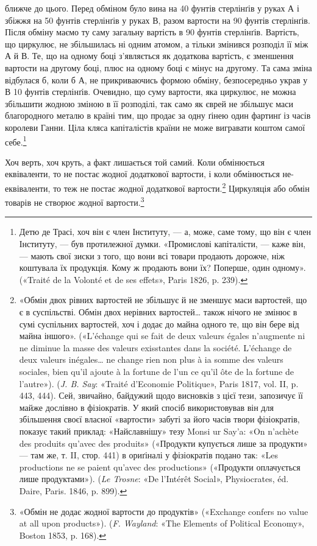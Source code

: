 \parcont{}  %
ближче до цього. Перед обміном було вина на 40 фунтів стерлінґів
у руках $А$ і збіжжя на 50 фунтів стерлінґів у руках $В$, разом
вартости на 90 фунтів стерлінґів. Після обміну маємо ту саму
загальну вартість в 90 фунтів стерлінґів. Вартість, що циркулює,
не збільшилась ні одним атомом, а тільки змінився розподіл її
між $А$ й $В$. Те, що на одному боці з’являється як додаткова вартість,
є зменшення вартости на другому боці, плюс на одному
боці є мінус на другому. Та сама зміна відбулася б, коли б $А$, не
прикриваючись формою обміну, безпосередньо украв у $В$ 10 фунтів
стерлінґів. Очевидно, що суму вартости, яка циркулює, не
можна збільшити жодною зміною в її розподілі, так само як єврей
не збільшує маси благородного металю в країні тим, що продає
за одну ґінею один фартинґ із часів королеви Ганни. Ціла
кляса капіталістів країни не може вигравати коштом самої себе.\footnote{
Детю де Трасі, хоч він є член Інституту, — а, може, саме тому,
що він є член Інституту, — був протилежної думки. «Промислові капіталісти,
— каже він, — мають свої зиски з того, що вони всі товари продають
дорожче, ніж коштувала їх продукція. Кому ж продають вони їх?
Поперше, один одному». («Traité de la Volonté et de ses effets», Paris
1826, p. 239).
}

Хоч верть, хоч круть, а факт лишається той самий. Коли обмінюється
еквіваленти, то не постає жодної додаткової вартости,
і коли обмінюється не-еквіваленти, то теж не постає жодної додаткової
вартости.\footnote{
«Обмін двох рівних вартостей не збільшує й не зменшує маси вартостей,
що є в суспільстві. Обмін двох нерівних вартостей\dots{} також нічого
не змінює в сумі суспільних вартостей, хоч і додає до майна одного те,
що він бере від майна іншого». («L’échange qui se fait de deux valeurs
égales n’augmente ni ne diminue la masse des valeurs exisstantes dans la
société. L’échange de deux valeurs inégales\dots{} ne change rien non plus à ia
somme des valeurs sociales, bien qu’il ajoute à la fortune de l’un ce qu’il
ôte de la fortune de l’autre»). (\emph{J. B. Say}: «Traité d’Economie Politique»,
Paris 1817, vol. II, p. 443, 444). Сей, звичайно, байдужий щодо висновків
з цієї тези, запозичує її майже дослівно в фізіократів. У який спосіб використовував
він для збільшення своєї власної «вартости» забуті за його
часів твори фізіократів, показує такий приклад: «Найславнішу» тезу
Monsi ur Say’a: «On n’achète des produits qu’avec des produits» («Продукти
купується лише за продукти» — там же, т. II, стор. 441) в ориґіналі
у фізіократів подано так: «Les productions ne se paient qu’avec des
productions» («Продукти оплачується лише продуктами»). (\emph{Le Trosne}:
«De l’Intérêt Social», Physiocrates, éd. Daire, Paris. 1846, p. 899).
} Циркуляція або обмін товарів не створює
жодної вартости.\footnote{
«Обмін не додає жодної вартости до продуктів» («Exchange confers
no value at all upon products»). (\emph{F. Wayland}: «The Elements of Political
Economy», Boston 1853, p. 168).
}

